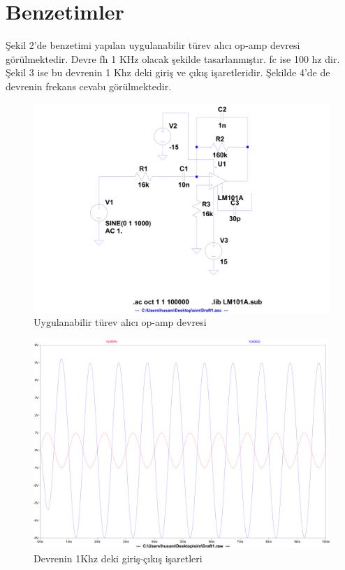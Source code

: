 \documentclass[]{scrartcl}
\begin{document}
\section{Benzetimler}
Şekil 2'de benzetimi yapılan uygulanabilir türev alıcı op-amp devresi görülmektedir. Devre fh 1 KHz olacak  şekilde tasarlanmıştır. fc ise 100 hz dir.  Şekil 3 ise bu devrenin 1 Khz deki giriş ve çıkış işaretleridir. Şekilde 4'de de devrenin frekans cevabı görülmektedir.

\begin{figure}
	\shorthandoff{=}
	\includegraphics[width=\linewidth]{Draft3}
	\shorthandon{=}
	\caption{Uygulanabilir türev alıcı op-amp devresi}
\end{figure}

\begin{figure}
	\shorthandoff{=}
	\includegraphics[width=\linewidth]{Draft1}
	\shorthandon{=}
	\caption{Devrenin 1Khz deki giriş-çıkış işaretleri}
\end{figure}
\end{document}

